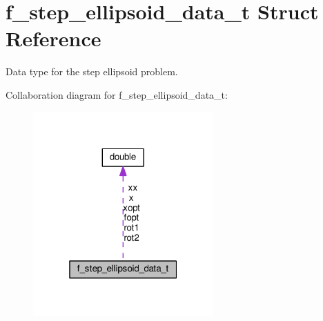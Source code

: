 \hypertarget{structf__step__ellipsoid__data__t}{}\section{f\+\_\+step\+\_\+ellipsoid\+\_\+data\+\_\+t Struct Reference}
\label{structf__step__ellipsoid__data__t}


Data type for the step ellipsoid problem.  




Collaboration diagram for f\+\_\+step\+\_\+ellipsoid\+\_\+data\+\_\+t\+:\nopagebreak
\begin{figure}[H]
\begin{center}
\leavevmode
\includegraphics[width=196pt]{structf__step__ellipsoid__data__t__coll__graph}
\end{center}
\end{figure}
